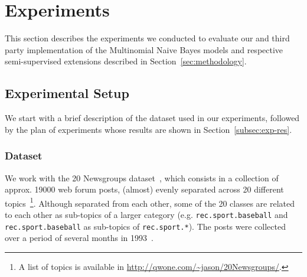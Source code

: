 \section{Experiments}
\label{sec:experiments}

This section describes the experiments we conducted to evaluate our and third 
party implementation of the Multinomial Naive Bayes models and respective 
semi-supervised extensions described in Section~\ref{sec:methodology}.

\subsection{Experimental Setup}
\label{subsec:exp-setup}

We start with a brief description of the dataset used in our experiments, 
followed by the plan of experiments whose results are shown 
in Section~\ref{subsec:exp-res}.

\subsubsection{Dataset}
\label{subsubsec:dataset}

We work with the 20 Newsgroups dataset~\cite{Lang95}, which consists in a 
collection of approx. 19000 web forum posts, (almost) evenly separated 
across 20 different topics~\footnote{A list of topics is available in \url{http://qwone.com/~jason/20Newsgroups/}.}. 
Although separated from each other, some of the 20 classes are related to each other as sub-topics of a larger 
category (e.g. \verb+rec.sport.baseball+ and \verb+rec.sport.baseball+ as 
sub-topics of \verb+rec.sport.*+). The posts were collected over a period 
of several months in 1993~\cite{Nigam2000}.\vertbreak 

